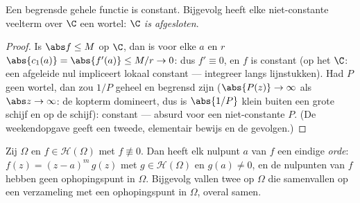\begin{corollary}
\label{cor:b3:holomorphic:liouville}
Een begrensde gehele functie is constant. Bijgevolg heeft elke
niet-constante veelterm over $\C$ een wortel: \emph{$\C$ is
 afgesloten}.
\end{corollary}

\begin{proof}
Is $\abs f \leq M$ op $\C$, dan is voor elke $a$ en $r$
$\abs{c_1(a)} = \abs{f'(a)} \leq M/r \to 0$: dus $f' \equiv 0$,
en $f$ is constant (op het  $\C$: een afgeleide nul
impliceert lokaal constant --- integreer langs lijnstukken). Had
$P$ geen wortel, dan zou $1/P$ geheel en begrensd zijn ($\abs{P(z)}
\to \infty$ als $\abs z \to \infty$: de kopterm domineert, dus is
$\abs{1/P}$ klein buiten een grote schijf en  op de
 schijf): constant --- absurd voor een niet-constante
$P$. (De weekendopgave geeft een tweede, elementair bewijs en de
 gevolgen.)
\end{proof}

\begin{theorem}
\label{thm:b3:holomorphic:identity}
Zij $\Omega$ \emph{} en $f \in \mathcal H(\Omega)$
met $f \not\equiv 0$. Dan heeft elk nulpunt $a$ van $f$ een
eindige \emph{orde}: $f(z) = (z - a)^m\,g(z)$ met $g \in \mathcal
H(\Omega)$ en $g(a) \neq 0$, en de nulpunten van $f$ hebben geen
ophopingspunt in $\Omega$. Bijgevolg vallen twee  op $\Omega$ die samenvallen op een verzameling met een
ophopingspunt in $\Omega$, overal
samen.
\end{theorem}

